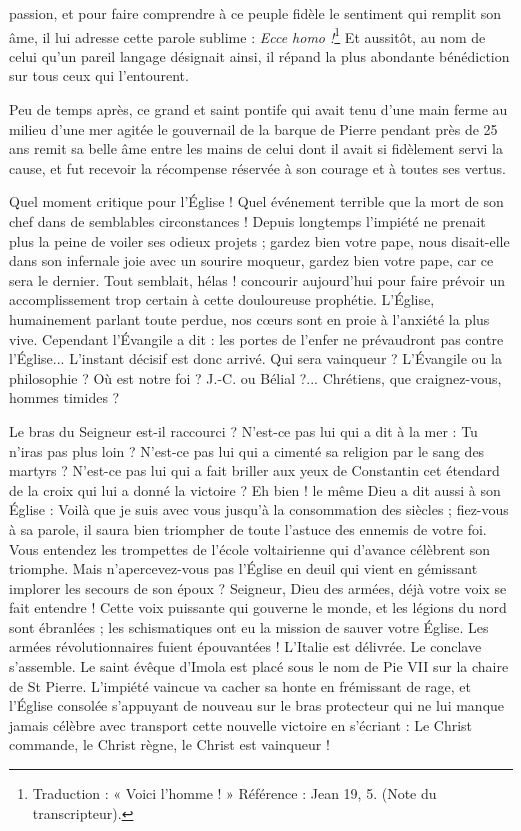passion, et pour faire comprendre à ce peuple fidèle le sentiment qui remplit son âme, il lui adresse cette parole sublime : \textit{Ecce homo !}\footnote{Traduction : « Voici l’homme ! » Référence : Jean 19, 5. (Note du transcripteur).} Et aussitôt, au nom de celui qu'un pareil langage désignait ainsi, il répand la plus abondante bénédiction sur tous ceux qui l'entourent.

Peu de temps après, ce grand et saint pontife qui avait tenu d'une main ferme au milieu d'une mer agitée le gouvernail de la barque de Pierre pendant près de 25 ans remit sa belle âme entre les mains de celui dont il avait si fidèlement servi la cause, et fut recevoir la récompense réservée à son courage et à toutes ses vertus.

Quel moment critique pour l'Église ! Quel événement terrible que la mort de son chef dans de semblables circonstances ! Depuis longtemps l'impiété ne prenait plus la peine de voiler ses odieux projets ; gardez bien votre pape, nous disait-elle dans son infernale joie avec un sourire moqueur, gardez bien votre pape, car ce sera le dernier. Tout semblait, hélas ! concourir aujourd'hui pour faire prévoir un accomplissement trop certain à cette douloureuse prophétie. L'Église, humainement parlant toute perdue, nos cœurs sont en proie à l'anxiété la plus vive. Cependant l'Évangile a dit : les portes de l'enfer ne prévaudront pas contre l'Église... L'instant décisif est donc arrivé. Qui sera vainqueur ? L'Évangile ou la philosophie ? Où est notre foi ? J.-C. ou Bélial ?... Chrétiens, que craignez-vous, hommes timides ?

Le bras du Seigneur est-il raccourci ? N'est-ce pas lui qui a dit à la mer : Tu n'iras pas plus loin ? N'est-ce pas lui qui a cimenté sa religion par le sang des martyrs ? N'est-ce pas lui qui a fait briller aux yeux de Constantin cet étendard de la croix qui lui a donné la victoire ? Eh bien ! le même Dieu a dit aussi à son Église : Voilà que je suis avec vous jusqu'à la consommation des siècles ; fiez-vous à sa parole, il saura bien triompher de toute l'astuce des ennemis de votre foi. Vous entendez les trompettes de l'école voltairienne qui d'avance célèbrent son triomphe. Mais n'apercevez-vous pas l'Église en deuil qui vient en gémissant implorer les secours de son époux ? Seigneur, Dieu des armées, déjà votre voix se fait entendre ! Cette voix puissante qui gouverne le monde, et les légions du nord sont ébranlées ; les schismatiques ont eu la mission de sauver votre Église. Les armées révolutionnaires fuient épouvantées ! L'Italie est délivrée. Le conclave s'assemble. Le saint évêque d'Imola est placé sous le nom de Pie VII sur la chaire de St Pierre. L'impiété vaincue va cacher sa honte en frémissant de rage, et l'Église consolée s'appuyant de nouveau sur le bras protecteur qui ne lui manque jamais célèbre avec transport cette nouvelle victoire en s'écriant : Le Christ commande, le Christ règne, le Christ est vainqueur !
